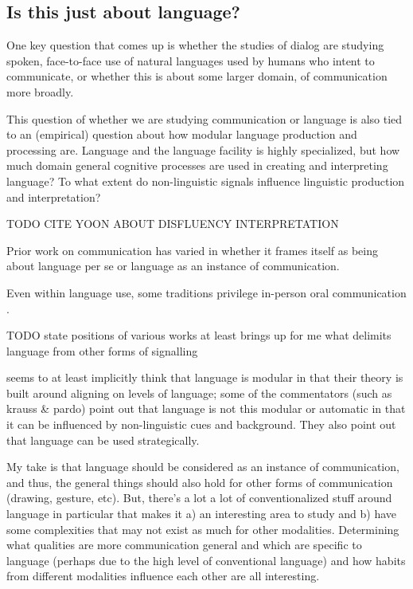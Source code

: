 \documentclass[]{article}
\begin{document}
\subsection{Is this just about language?}


One key question that comes up is whether the studies of dialog are studying spoken, face-to-face use of natural languages used by humans who intent to communicate, or whether this is about some larger domain, of communication more broadly. 

This question of whether we are studying communication or language is also tied to an (empirical) question about how modular language production and processing are. Language and the language facility is highly specialized, but how much domain general cognitive processes are used in creating and interpreting language? To what extent do non-linguistic signals influence linguistic production and interpretation? 

TODO CITE YOON ABOUT DISFLUENCY INTERPRETATION

Prior work on communication has varied in whether it frames itself as being about language per se or language as an instance of communication. 


Even within language use, some traditions privilege in-person oral communication \cite{clark1996}. 

TODO state positions of various works
\cite{clark1996} at least brings up for me what delimits language from other forms of signalling

\cite{pickering2004} seems to at least implicitly think that language is modular in that their theory is built around aligning on levels of language; some of the commentators (such as krauss \& pardo) point out that language is not this modular or automatic in that it can be influenced by non-linguistic cues and background. They also point out that language can be used strategically. 



My take is that language should be considered as an instance of communication, and thus, the general things should also hold for other forms of communication (drawing, gesture, etc). But, there's a lot a lot of conventionalized stuff around language in particular that makes it a) an interesting area to study and b) have some complexities that may not exist as much for other modalities. Determining what qualities are more communication general and which are specific to language (perhaps due to the high level of conventional language) and how habits from different modalities influence each other are all interesting. 
\end{document}
